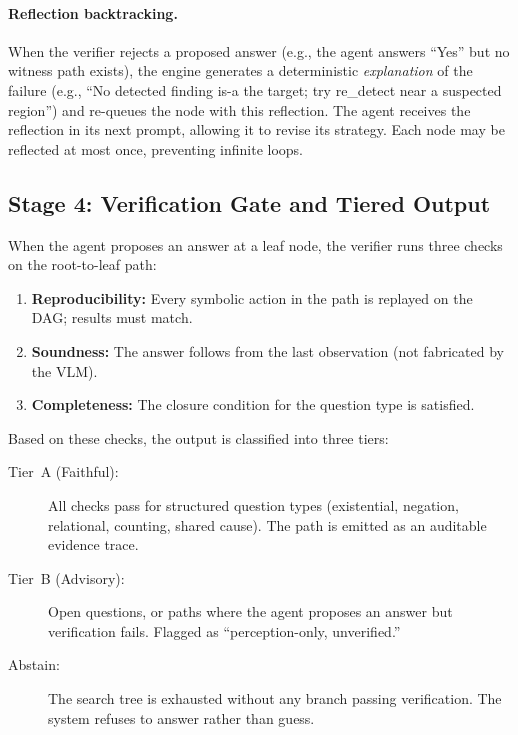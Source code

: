 \documentclass[runningheads]{llncs}
\begin{document}
\paragraph{Reflection backtracking.}
When the verifier rejects a proposed answer (e.g., the agent answers
``Yes'' but no witness path exists), the engine generates a deterministic
\emph{explanation} of the failure (e.g., ``No detected finding is-a the
target; try re\_detect near a suspected region'') and re-queues the node
with this reflection.
The agent receives the reflection in its next prompt, allowing it to
revise its strategy.
Each node may be reflected at most once, preventing infinite loops.


\subsection{Stage 4: Verification Gate and Tiered Output}

When the agent proposes an answer at a leaf node, the verifier runs
three checks on the root-to-leaf path:

\begin{enumerate}
  \item \textbf{Reproducibility:} Every symbolic action in the path is
    replayed on the DAG; results must match.
  \item \textbf{Soundness:} The answer follows from the last observation
    (not fabricated by the VLM).
  \item \textbf{Completeness:} The closure condition for the question type
    is satisfied.
\end{enumerate}

\noindent
Based on these checks, the output is classified into three tiers:

\begin{description}
  \item[Tier~A (Faithful):] All checks pass for structured question types
    (existential, negation, relational, counting, shared cause).
    The path is emitted as an auditable evidence trace.
  \item[Tier~B (Advisory):] Open questions, or paths where the agent
    proposes an answer but verification fails.
    Flagged as ``perception-only, unverified.''
  \item[Abstain:] The search tree is exhausted without any branch passing
    verification. The system refuses to answer rather than guess.
\end{description}
\end{document}

